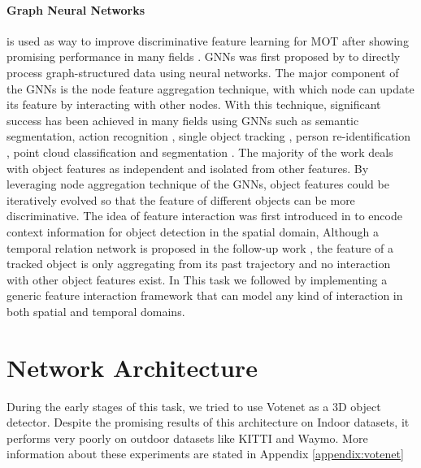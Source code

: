 \documentclass[10pt,twocolumn,letterpaper]{article}
\begin{document}
\paragraph{Graph Neural Networks} is used as way to improve discriminative feature learning for MOT after showing promising performance in many fields \cite{hamilton2017inductive,velivckovic2017graph,kipf2016semi, berg2017graph, monti2017geometric, ying2018graph}. GNNs was first proposed by \cite{gori2005new} to directly process graph-structured data using neural networks. The major component of the GNNs is the node feature aggregation technique, with which node can update its feature by interacting with other nodes. With this technique, significant success has been achieved in many fields using GNNs such as semantic segmentation\cite{chen2019graph}, action recognition \cite{shi2019skeleton}, single object tracking \cite{gao2019graph}, person re-identification \cite{wu2019unsupervised}, point cloud classification and segmentation \cite{wang2019dynamic}. The majority of the work deals with object features as independent and isolated from other features. By leveraging node aggregation technique of the GNNs, object features could be iteratively evolved so that the feature of different objects can be more discriminative. The idea of feature interaction was first introduced in \cite{hu2018relation} to encode context information for object detection in the spatial domain, Although a temporal relation network is proposed in the follow-up work \cite{xu2019spatial}, the feature of a tracked object is only aggregating from its past trajectory and no interaction with other object features exist. In This task we followed \cite{yin2020center} by implementing a generic feature interaction framework that can model any kind of interaction in both spatial and temporal domains.




\section{Network Architecture}

During the early stages of this task, we tried to use Votenet \cite{qi2019deep} as a 3D object detector. Despite the promising results of this architecture on Indoor datasets, it performs very poorly on outdoor datasets like KITTI and Waymo. More information about these experiments are stated in Appendix \ref{appendix:votenet}
\end{document}
